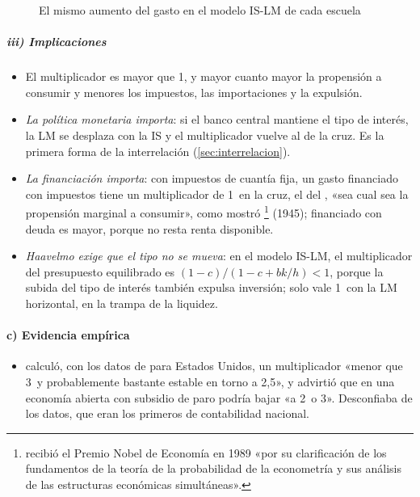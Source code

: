 \documentclass[11pt]{article}
\begin{document}
\begin{figure}[H]
\centering
\caption{El mismo aumento del gasto en el modelo IS-LM de cada escuela}\label{fig:islm-escuelas}
\end{figure}

\subparagraph{iii) Implicaciones}

\begin{itemize}
\item El multiplicador es mayor que 1, y mayor cuanto mayor la propensión a consumir y menores los impuestos, las importaciones y la expulsión.
\item \emph{La política monetaria importa}: si el banco central mantiene el tipo de interés, la LM se desplaza con la IS y el multiplicador vuelve al de la cruz. Es la primera forma de la interrelación (\ref{sec:interrelacion}).
\item \emph{La financiación importa}: con impuestos de cuantía fija, un gasto financiado con impuestos tiene un multiplicador de 1~en la cruz, el del , «sea cual sea la propensión marginal a consumir», como mostró \footnote{ recibió el Premio Nobel de Economía en 1989 «por su clarificación de los fundamentos de la teoría de la probabilidad de la econometría y sus análisis de las estructuras económicas simultáneas»\nocite{Nobel1989Haavelmo}.} (1945)\nocite{Haavelmo1945Multiplier}; financiado con deuda es mayor, porque no resta renta disponible.
\item \emph{Haavelmo exige que el tipo no se mueva}: en el modelo IS-LM, el multiplicador del presupuesto equilibrado es $(1-c)/(1-c+bk/h)<1$, porque la subida del tipo de interés también expulsa inversión; solo vale 1~con la LM horizontal, en la trampa de la liquidez.
\end{itemize}

\paragraph{c) Evidencia empírica}

\begin{itemize}
\item {} calculó, con los datos de  para Estados Unidos, un multiplicador «menor que 3~y probablemente bastante estable en torno a 2,5», y advirtió que en una economía abierta con subsidio de paro podría bajar «a 2~o 3»\nocite{Keynes1936}. Desconfiaba de los datos, que eran los primeros de contabilidad nacional.
\end{itemize}
\end{document}
